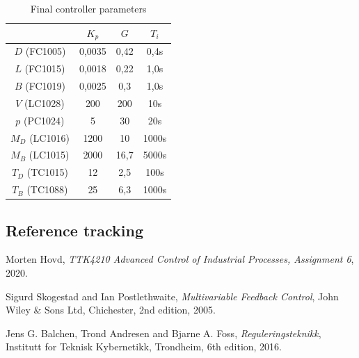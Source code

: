 \documentclass[12pt]{article}
\begin{document}
\begin{table}
\centering
\begin{tabular}{c | c | c | c }
& $K_p$ & $G$ & $T_i$ \\ \hline
$D$ (FC1005) & 0,0035 & 0,42& 0,4s\\
$L$ (FC1015) & 0,0018 & 0,22 & 1,0s \\
$B$ (FC1019) & 0,0025 & 0,3 & 1,0s \\
$V$ (LC1028) & 200 & 200 & 10s \\
$p$ (PC1024) & 5 & 30 & 20s \\
$M_D$ (LC1016) & 1200 & 10 & 1000s \\
$M_B$ (LC1015) & 2000 & 16,7 & 5000s \\
$T_D$ (TC1015) & 12 & 2,5 & 100s \\
$T_B$ (TC1088) & 25 & 6,3 & 1000s
\end{tabular}
\caption{Final controller parameters}
\label{tab:final_controller_parameters}
\end{table}

\subsection{Reference tracking}

\newpage
\begin{thebibliography}{9}

  Morten Hovd,
  \textit{TTK4210 Advanced Control of Industrial Processes, Assignment 6},
  2020.

  Sigurd Skogestad and Ian Postlethwaite,
  \textit{Multivariable Feedback Control},
  John Wiley \& Sons Ltd, Chichester,
  2nd edition,
  2005.
  
  Jens G. Balchen, Trond Andresen and Bjarne A. Foss,
  \textit{Reguleringsteknikk},
  Institutt for Teknisk Kybernetikk, Trondheim,
  6th edition,
  2016.

\end{thebibliography}
\end{document}
